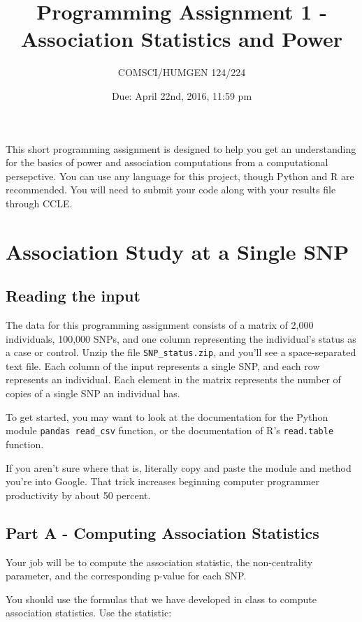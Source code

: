 \documentclass{article}
\begin{document}
\title{Programming Assignment 1 - Association Statistics and Power}

\author{COMSCI/HUMGEN 124/224}

\date{Due: April 22nd, 2016, 11:59 pm}

\maketitle

This short programming assignment is designed to help you get an
understanding for the basics of power and association computations
from a computational persepctive. You can use any language
for this project, though Python and R are recommended. You will
need to submit your code along with your results file through CCLE.


\section*{Association Study at a Single SNP}

\subsection*{Reading the input}
The data for this programming assignment consists of a matrix
of 2,000 individuals, 100,000 SNPs, and one column representing
the individual's status as a case or control. Unzip the file \verb!SNP_status.zip!,
and you'll see a space-separated text file.
Each column of the input represents a single SNP, and each row
represents an individual. Each element in the matrix represents
the number of copies of a single SNP an individual has.

To get started, you may want to look at the documentation for
the Python module \verb!pandas read_csv! function,
or the documentation of R's \texttt{read.table} function.

If you aren't sure where that is, literally copy and paste
the module and method you're into Google. That trick
increases beginning computer 
programmer productivity by about 50 percent.


\subsection*{Part A - Computing Association Statistics}
Your job will be to compute the association statistic, the non-centrality
parameter, and the corresponding p-value for each SNP.

You should use the formulas that we have developed in
class to compute association statistics.  Use the statistic:
\end{document}
